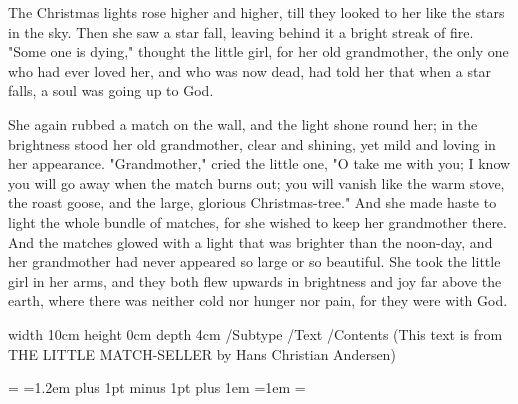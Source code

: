 {    The Christmas lights rose higher and higher, till they looked to
her like the stars in the sky. Then she saw a star fall, leaving
behind it a bright streak of fire. "Some one is dying," thought the
little girl, for her old grandmother, the only one who had ever
loved her, and who was now dead, had told her that when a star
falls, a soul was going up to God.

    She again rubbed a match on the wall, and the light shone round
her; in the brightness stood her old grandmother, clear and shining,
yet mild and loving in her appearance. "Grandmother," cried the little
one, "O take me with you; I know you will go away when the match burns
out; you will vanish like the warm stove, the roast goose, and the
large, glorious Christmas-tree." And she made haste to light the whole
bundle of matches, for she wished to keep her grandmother there. And
the matches glowed with a light that was brighter than the noon-day,
and her grandmother had never appeared so large or so beautiful. She
took the little girl in her arms, and they both flew upwards in
brightness and joy far above the earth, where there was neither cold
nor hunger nor pain, for they were with God.
}

\pdfannot               %
    width 10cm          %
    height 0cm          %
    depth  4cm          %
{                       %
    /Subtype /Text      %
    /Contents           %
        (This text is from THE LITTLE MATCH-SELLER by Hans Christian
         Andersen)
}

\def\colsep{\qquad}          %
=\vbox{%
    \baselineskip=1.2em plus 1pt minus 1pt
    \hsize=2in
    \rightskip=0pt plus 1em
    \hfuzz=1em
    \parskip=\baselineskip
    \null                   %
    \text
    \vfil}

